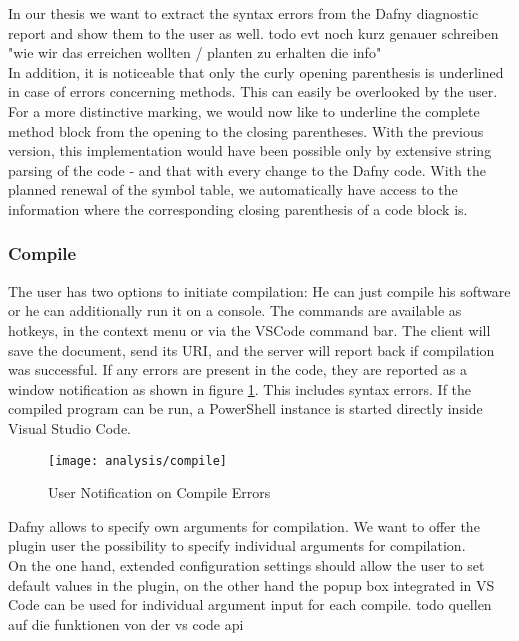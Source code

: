 In our thesis we want to extract the syntax errors from the Dafny diagnostic report and show them to the user as well.
todo evt noch kurz genauer schreiben "wie wir das erreichen wollten / planten zu erhalten die info" \\

In addition, it is noticeable that only the curly opening parenthesis is underlined in case of errors concerning methods.
This can easily be overlooked by the user.
For a more distinctive marking, we would now like to underline the complete method block from the opening to the closing parentheses.
With the previous version, this implementation would have been possible only by extensive string parsing of the code - and that with every change to the Dafny code.
With the planned renewal of the symbol table, we automatically have access to the information where the corresponding closing parenthesis of a code block is.

\subsubsection{Compile}
The user has two options to initiate compilation: He can just compile his software or he can additionally run it on a console. The commands are available as hotkeys, in the context menu or via the VSCode command bar. The client will save the document, send its URI, and the server will report back if compilation was successful. If any errors are present in the code, they are reported as a window notification as shown in figure \ref{fig:analysis_compile}. This includes syntax errors. If the compiled program can be run, a PowerShell instance is started directly inside Visual Studio Code.

\begin{figure}[H]
    \centering
    \texttt{[image: analysis/compile]}
    \caption{User Notification on Compile Errors}
    \label{fig:analysis_compile}
\end{figure}

Dafny allows to specify own arguments for compilation.
We want to offer the plugin user the possibility to specify individual arguments for compilation. \\

On the one hand, extended configuration settings should allow the user to set default values in the plugin, on the other hand the popup box integrated in VS Code can be used for individual argument input for each compile.
todo quellen auf die funktionen von der vs code api


